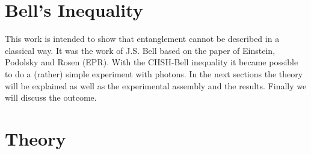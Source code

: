 \documentclass[12pt,a4paper]{article}
\begin{document}

\pagebreak
\setlength{\columnsep}{20pt}
\begin{multicols}{2}

\begin{abstract}

\end{abstract}

%

\section{Bell's Inequality}
This work is intended to show that entanglement cannot be described in a classical way. It was the work of J.S. Bell based on the paper of Einstein, Podolsky and Rosen (EPR). With the CHSH-Bell inequality it became possible to do a (rather) simple experiment with photons. In the next sections the theory will be explained as well as the experimental assembly and the results. Finally we will discuss the outcome.

\section{Theory}
\label{theory}


\end{multicols}
\end{document}
